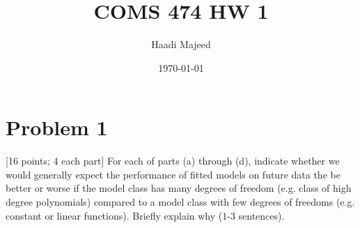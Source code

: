 \documentclass[11pt]{article}
\title{ COMS 474 HW 1 }
\author{ Haadi Majeed }
\date{\today}
\begin{document}
\maketitle
\pagebreak

\tableofcontents
\pagebreak


\section{Problem 1}

 [16 points; 4 each part] For each of parts (a) through (d), indicate whether
we would generally expect the performance of fitted models on future data the be better or
worse if the model class has many degrees of freedom (e.g. class of high degree polynomials)
compared to a model class with few degrees of freedoms (e.g. constant or linear functions).
Briefly explain why (1-3 sentences).
\end{document}
